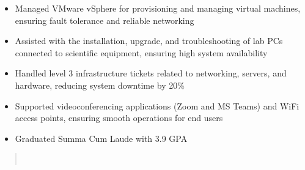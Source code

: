 \par\smallskip
\begin{minipage}{13.75cm}
  \begin{minipage}{6.5cm}
    \begin{itemize}
      \item Managed VMware vSphere for provisioning and managing virtual machines, ensuring fault tolerance and reliable networking
      \item Assisted with the installation, upgrade, and troubleshooting of lab PCs connected to scientific equipment, ensuring high system availability
    \end{itemize}
  \end{minipage}
  \hfill
  \begin{minipage}{6.5cm}
    \begin{itemize}
      \item Handled level 3 infrastructure tickets related to networking, servers, and hardware, reducing system downtime by 20\%
      \item Supported videoconferencing applications (Zoom and MS Teams) and WiFi access points, ensuring smooth operations for end users
    \end{itemize}
  \end{minipage}
\end{minipage}

\par\bigskip
{}
\begin{itemize}
  \item Graduated Summa Cum Laude with 3.9 GPA
\end{itemize}
\divider

\begin{quote}
  \hfill{}\\
  \hfill{}
\end{quote}


